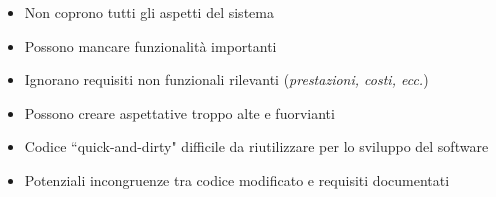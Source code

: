 \begin{tcolorbox}[colback=red!5!white,colframe=red!75!black, title=Contro
    dei prototipi e mock-up]
    \begin{itemize}
        \item Non coprono tutti gli aspetti del sistema
        \item Possono mancare funzionalità importanti
        \item Ignorano requisiti non funzionali rilevanti
        (\textit{prestazioni, costi, ecc.})
        \item Possono creare aspettative troppo alte e fuorvianti
        \item Codice ``quick-and-dirty" difficile da riutilizzare per lo sviluppo
        del software
        \item Potenziali incongruenze tra codice modificato e requisiti documentati
    \end{itemize}
\end{tcolorbox}
